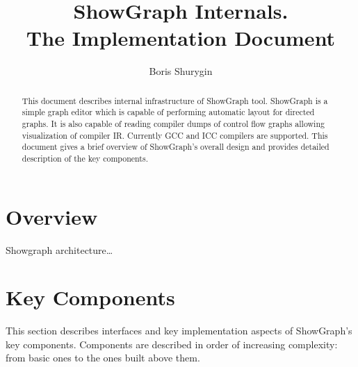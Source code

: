 \documentclass[11pt,twoside,a4paper]{article}
\begin{document}
 
\lstset{language=[Visual]C++}

\title{ShowGraph Internals.\\ \textsf{The Implementation Document}}
\author{Boris Shurygin}

\maketitle
\begin{abstract}
This document describes internal infrastructure of ShowGraph tool. ShowGraph is a simple graph editor which is capable of performing automatic layout for directed graphs. It is also capable of reading compiler dumps of control flow graphs allowing visualization of compiler IR. Currently GCC and ICC compilers are supported. This document gives a brief overview of ShowGraph's overall design and provides detailed description of the key components.
\end{abstract}
\tableofcontents
\section{Overview}
Showgraph architecture\ldots
\section{Key Components}
This section describes interfaces and key implementation aspects of ShowGraph's key components. Components are described in order of increasing complexity: from basic ones to the ones built above them.
\end{document}
